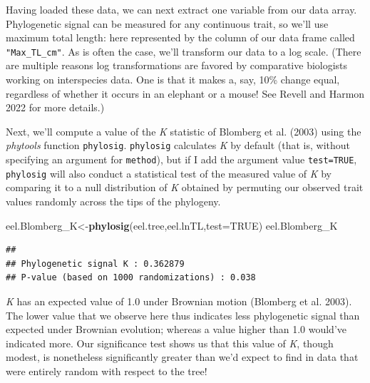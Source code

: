 \documentclass[fleqn,10pt,lineno]{wlpeerj} %
\newenvironment{Shaded}{\begin{snugshade}}{\end{snugshade}}
\newcommand{\AttributeTok}[1]{\textcolor[rgb]{0.13,0.29,0.53}{#1}}
\newcommand{\ConstantTok}[1]{\textcolor[rgb]{0.56,0.35,0.01}{#1}}
\newcommand{\FunctionTok}[1]{\textcolor[rgb]{0.13,0.29,0.53}{\textbf{#1}}}
\newcommand{\NormalTok}[1]{#1}
\newcommand{\OtherTok}[1]{\textcolor[rgb]{0.56,0.35,0.01}{#1}}
\newcommand{\SpecialCharTok}[1]{\textcolor[rgb]{0.81,0.36,0.00}{\textbf{#1}}}
\begin{document}
Having loaded these data, we can next extract one variable from our data array. Phylogenetic signal can be measured for any continuous trait, so we'll use maximum total length: here represented by the column of our data frame called \texttt{"Max\_TL\_cm"}. As is often the case, we'll transform our data to a log scale. (There are multiple reasons log transformations are favored by comparative biologists working on interspecies data. One is that it makes a, say, 10\% change equal, regardless of whether it occurs in an elephant or a mouse! See Revell and Harmon 2022 for more details.)

\begin{Shaded}
\end{Shaded}

Next, we'll compute a value of the \emph{K} statistic of Blomberg et al. (2003) using the \emph{phytools} function \texttt{phylosig}. \texttt{phylosig} calculates \emph{K} by default (that is, without specifying an argument for \texttt{method}), but if I add the argument value \texttt{test=TRUE}, \texttt{phylosig} will also conduct a statistical test of the measured value of \emph{K} by comparing it to a null distribution of \emph{K} obtained by permuting our observed trait values randomly across the tips of the phylogeny.

\begin{Shaded}
\begin{Highlighting}[]
\NormalTok{eel.Blomberg\_K}\OtherTok{\textless{}{-}}\FunctionTok{phylosig}\NormalTok{(eel.tree,eel.lnTL,}\AttributeTok{test=}\ConstantTok{TRUE}\NormalTok{)}
\NormalTok{eel.Blomberg\_K}
\end{Highlighting}
\end{Shaded}

\begin{verbatim}
## 
## Phylogenetic signal K : 0.362879 
## P-value (based on 1000 randomizations) : 0.038
\end{verbatim}

\emph{K} has an expected value of 1.0 under Brownian motion (Blomberg et al. 2003). The lower value that we observe here thus indicates less phylogenetic signal than expected under Brownian evolution; whereas a value higher than 1.0 would've indicated more. Our significance test shows us that this value of \emph{K}, though modest, is nonetheless significantly greater than we'd expect to find in data that were entirely random with respect to the tree!
\end{document}
